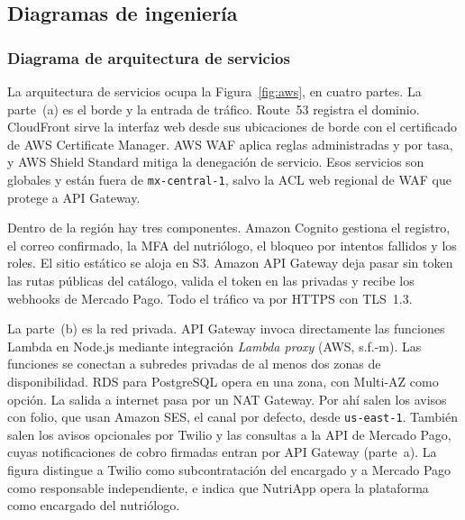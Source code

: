 \documentclass[12pt, a4paper]{article}
\begin{document}
\subsection{Diagramas de ingeniería}

\subsubsection{Diagrama de arquitectura de servicios}

La arquitectura de servicios ocupa la Figura~\ref{fig:aws}, en cuatro
partes. La parte~(a) es el borde y la entrada de tráfico. Route~53
registra el dominio. CloudFront sirve la interfaz web desde sus
ubicaciones de borde con el certificado de AWS Certificate Manager. AWS
WAF aplica reglas administradas y por tasa, y AWS Shield Standard mitiga
la denegación de servicio. Esos servicios son globales y están fuera de
\texttt{mx-central-1}, salvo la ACL web regional de WAF que protege a
API Gateway.

Dentro de la región hay tres componentes. Amazon Cognito gestiona el
registro, el correo confirmado, la MFA del nutriólogo, el bloqueo por
intentos fallidos y los roles. El sitio estático se aloja en S3. Amazon
API Gateway deja pasar sin token las rutas públicas del catálogo, valida
el token en las privadas y recibe los webhooks de Mercado Pago. Todo el
tráfico va por HTTPS con TLS~1.3.
 
La parte~(b) es la red privada. API Gateway invoca directamente las
funciones Lambda en Node.js mediante integración \textit{Lambda proxy}
(AWS, s.f.-m). Las funciones se conectan a subredes privadas de al menos
dos zonas de disponibilidad. RDS para PostgreSQL opera en una zona, con
Multi-AZ como opción. La salida a internet pasa por un NAT Gateway. Por
ahí salen los avisos con folio, que usan Amazon SES, el canal por
defecto, desde \texttt{us-east-1}. También salen los avisos opcionales
por Twilio y las consultas a la API de Mercado Pago, cuyas
notificaciones de cobro firmadas entran por API Gateway (parte~a). La
figura distingue a Twilio como subcontratación del encargado y a Mercado
Pago como responsable independiente, e indica que NutriApp opera la
plataforma como encargado del nutriólogo.
 
\end{document}
